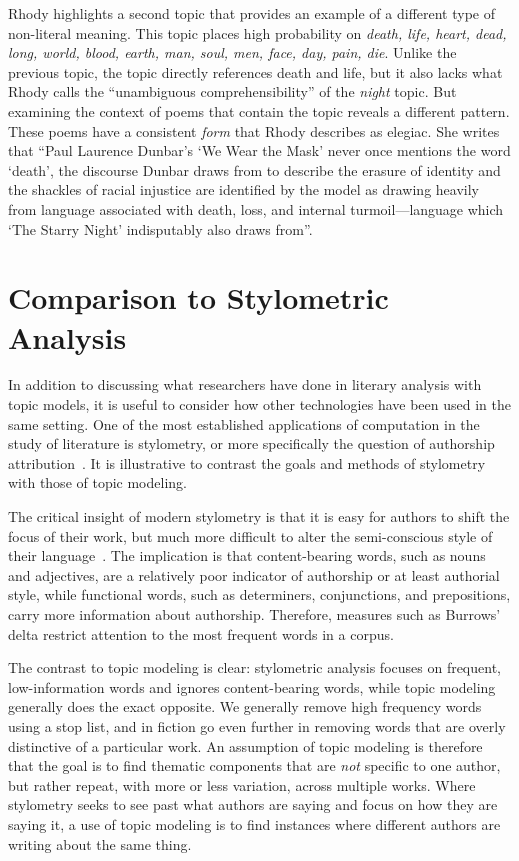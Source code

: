 {Rhody highlights a second topic that provides an example of a different type of non-literal meaning.
This topic places high probability on {\em death, life, heart, dead, long, world, blood, earth, man, soul, men, face, day, pain, die}.
Unlike the previous topic, the topic directly references death and life, but it also lacks what Rhody calls the ``unambiguous comprehensibility'' of the {\em night} topic.
But examining the context of poems that contain the topic reveals a different pattern.
These poems have a consistent {\em form} that Rhody describes as elegiac.
She writes that ``Paul Laurence Dunbar's `We Wear the Mask' never once mentions the word `death', the discourse Dunbar draws from to describe the erasure of identity and the shackles of racial injustice are identified by the model as drawing heavily from language associated with death, loss, and internal turmoil---language which `The Starry Night' indisputably also draws from''.

\section{Comparison to Stylometric Analysis}

In addition to discussing what researchers have done in literary analysis with topic models, it is useful to consider how other technologies have been used in the same setting.
One of the most established applications of computation in the study of literature is stylometry, or more specifically the question of authorship attribution~\citep{juola2006authorship}.
It is illustrative to contrast the goals and methods of stylometry with those of topic modeling.

The critical insight of modern stylometry is that it is easy for authors to shift the focus of their work, but much more difficult to alter the semi-conscious style of their language~\citep{mosteller1964inference}.
The implication is that content-bearing words, such as nouns and adjectives, are a relatively poor indicator of authorship or at least authorial style, while functional words, such as determiners, conjunctions, and prepositions, carry more information about authorship.
Therefore, measures such as Burrows' delta \citep{burrows2002delta} restrict attention to the most frequent words in a corpus.

The contrast to topic modeling is clear: stylometric analysis focuses on frequent, low-information words and ignores content-bearing words, while topic modeling generally does the exact opposite.
We generally remove high frequency words using a stop list, and in fiction go even further in removing words that are overly distinctive of a particular work.
An assumption of topic modeling is therefore that the goal is to find thematic components that are {\em not} specific to one author, but rather repeat, with more or less variation, across multiple works.
Where stylometry seeks to see past what authors are saying and focus on how they are saying it, a use of topic modeling is to find instances where different authors are writing about the same thing.

}
